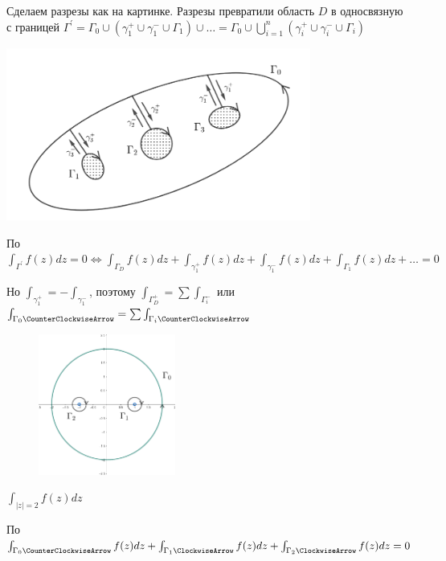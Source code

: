 \begin{MyProof}
    Сделаем разрезы как на картинке. 
    Разрезы превратили область $D$ в односвязную с границей $\Gamma^\prime = \Gamma_0 \cup (\gamma_1^+ \cup \gamma_1^- \cup \Gamma_1) \cup \dots = \Gamma_0 \cup \bigcup_{i = 1}^n (\gamma_i^+ \cup \gamma_i^- \cup \Gamma_i)$

    \begin{center}
        \includegraphics[width=10cm]{addchapters2/images/addchapters2_2025_04_04_3}
    \end{center}

    По  $\int_{\Gamma^\prime} f(z) dz = 0 \Longleftrightarrow \int_{\Gamma_D} f(z) dz + \int_{\gamma^+_1} f(z) dz + \int_{\gamma^-_1} f(z) dz + \int_{\Gamma_1} f(z) dz + \dots = 0$

    Но $\int_{\gamma_1^+} = - \int_{\gamma_1^-}$, поэтому $\int_{\Gamma_D^+} = \sum \int_{\Gamma_i^-}$ или $\int_{\Gamma_0 \CounterClockwiseArrow} = \sum \int_{\Gamma_i \CounterClockwiseArrow}$
\end{MyProof}


\begin{figure}
    \includegraphics[width=4.5cm]{addchapters2/images/addchapters2_2025_04_04_4}
\end{figure}

\Ex $\int_{|z| = 2} f(z) dz$

По  $\int_{\Gamma_0 \CounterClockwiseArrow} f(z) dz + \int_{\Gamma_1 \ClockwiseArrow} f(z) dz + \int_{\Gamma_2 \ClockwiseArrow} f(z) dz = 0$

